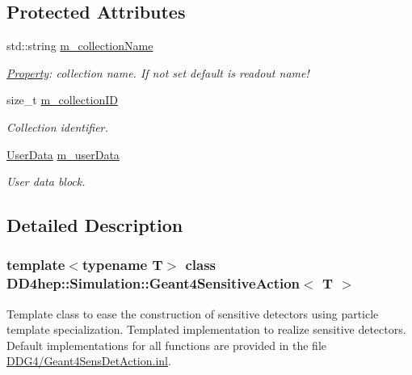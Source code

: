 \subsection*{Protected Attributes}
\begin{DoxyCompactItemize}
\item 
std::string \hyperlink{class_d_d4hep_1_1_simulation_1_1_geant4_sensitive_action_a63934f5c71f72677f47b6666dbedba69}{m\_\-collectionName}
\begin{DoxyCompactList}\small\item\em \hyperlink{class_d_d4hep_1_1_property}{Property}: collection name. If not set default is readout name! \item\end{DoxyCompactList}\item 
size\_\-t \hyperlink{class_d_d4hep_1_1_simulation_1_1_geant4_sensitive_action_aa73c450b64116d4e52be7accbef7bea9}{m\_\-collectionID}
\begin{DoxyCompactList}\small\item\em Collection identifier. \item\end{DoxyCompactList}\item 
\hyperlink{class_d_d4hep_1_1_simulation_1_1_geant4_sensitive_action_a1aa349c02363cf7471a043ad5f3b95c9}{UserData} \hyperlink{class_d_d4hep_1_1_simulation_1_1_geant4_sensitive_action_a0e1c5a4683c5a4e50a0e3325b61f5275}{m\_\-userData}
\begin{DoxyCompactList}\small\item\em User data block. \item\end{DoxyCompactList}\end{DoxyCompactItemize}


\subsection{Detailed Description}
\subsubsection*{template$<$typename T$>$ class DD4hep::Simulation::Geant4SensitiveAction$<$ T $>$}

Template class to ease the construction of sensitive detectors using particle template specialization. Templated implementation to realize sensitive detectors. Default implementations for all functions are provided in the file \hyperlink{_geant4_sens_det_action_8inl}{DDG4/Geant4SensDetAction.inl}.

